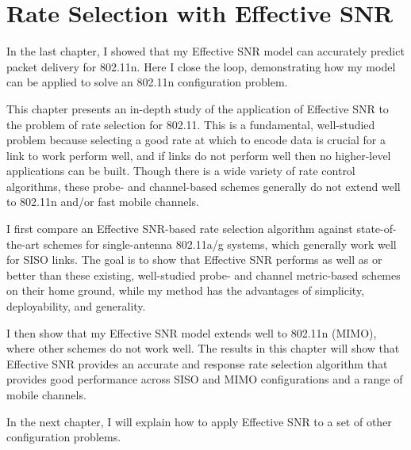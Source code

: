 \ifx\mainfile\undefined

\setcounter{chapter}{6} %
\fi

\cleardoublepage
\chapter{Rate Selection with Effective SNR}
\label{chap:rate}

In the last chapter, I showed that my Effective SNR model can accurately predict packet delivery for 802.11n. Here I close the loop, demonstrating how my model can be applied to solve an 802.11n configuration problem.

This chapter presents an in-depth study of the application of Effective SNR to the problem of rate selection for 802.11. This is a fundamental, well-studied problem because selecting a good rate at which to encode data is crucial for a link to work perform well, and if links do not perform well then no higher-level applications can be built. Though there is a wide variety of rate control algorithms, these probe- and channel-based schemes generally do not extend well to 802.11n and/or fast mobile channels.

I first compare an Effective SNR-based rate selection algorithm against state-of-the-art schemes for single-antenna 802.11a/g systems, which generally work well for SISO links. The goal is to show that Effective SNR performs as well as or better than these existing, well-studied probe- and channel metric-based schemes on their home ground, while my method has the advantages of simplicity, deployability, and generality.

I then show that my Effective SNR model extends well to 802.11n (MIMO), where other schemes do not work well. The results in this chapter will show that Effective SNR provides an accurate and response rate selection algorithm that provides good performance across SISO and MIMO configurations and a range of mobile channels.

In the next chapter, I will explain how to apply Effective SNR to a set of other configuration problems.


